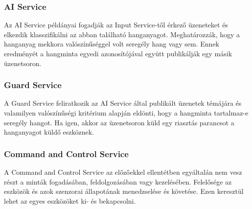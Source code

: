 \subsubsection{AI Service}
\label{subsect:birdnetes-ai-service}
Az AI Service példányai fogadják az Input Service-től érkező üzeneteket és elkezdik klasszifikálni az abban található hanganyagot.
Meghatározzák, hogy a hanganyag mekkora valószínűséggel volt seregély hang vagy sem.
Ennek eredményét a hangminta egyedi azonosítójával együtt publikálják egy másik üzenetsoron.

\subsubsection{Guard Service}
A Guard Service feliratkozik az AI Service által publikált üzenetek témájára 
és valamilyen valószínűségi kritérium alapján eldönti, hogy a hangminta tartalmaz-e seregély hangot.
Ha igen, akkor az üzenetsoron küld egy riasztás parancsot a hanganyagot küldő eszköznek.

\subsubsection{Command and Control Service}
A Command and Control Service az előzőekkel ellentétben egyáltalán nem vesz részt a minták fogadásában, feldolgozásában vagy kezelésében.
Felelősége az eszközök és azok szenzorai állapotának menedzselése és követése.
Ezen keresztül lehet az egyes eszközöket ki- és bekapcsolni.